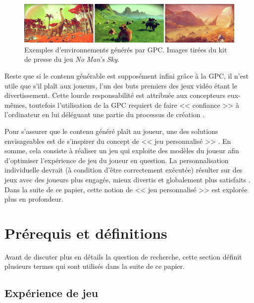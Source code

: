 \documentclass[a4paper,11pt]{article}
\begin{document}
      \begin{figure}
        \centering
        \includegraphics[width=\textwidth]{fig1.png}
        \caption{Exemples d'environnements générés par GPC. Images tirées du kit de presse du jeu \textit{No Man's Sky}\cite{game:NoMansSky}.}
        \label{fig:pcg}
      \end{figure}

      Reste que si le contenu générable est supposément infini grâce à la GPC, il n'est utile que s'il plaît aux joueurs, l'un des buts premiers des jeux vidéo étant le divertissement.
      Cette lourde responsabilité est attribuée aux concepteurs eux-mêmes, toutefois l'utilisation de la GPC requiert de faire << confiance >> à l'ordinateur en lui déléguant une partie du processus de création \cite{Riedl}.  
      
      Pour s'assurer que le contenu généré plaît au joueur, une des solutions envisageables est de s'inspirer du concept de << jeu personnalisé >> \cite{Bakkes}.
      En somme, cela consiste à réaliser un jeu qui exploite des modèles du joueur afin d'optimiser l'expérience de jeu du joueur en question.
      La personnalisation individuelle devrait (à condition d'être correctement exécutée) résulter sur des jeux avec des joueurs plus engagés, mieux divertis et globalement plus satisfaits \cite{Bakkes}.
      Dans la suite de ce papier, cette notion de << jeu personnalisé >> est explorée plus en profondeur.


    \section{Prérequis et définitions}\label{section:defs}

      Avant de discuter plus en détails la question de recherche, cette section définit plusieurs termes qui sont utilisés dans la suite de ce papier.
      
      \subsection{Expérience de jeu}\label{section:defs-pem}
\end{document}
